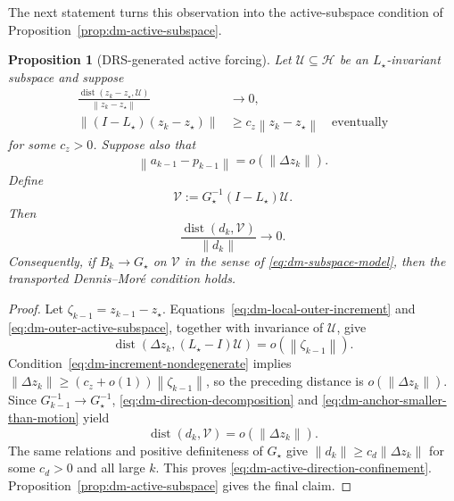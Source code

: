 \documentclass[10pt,leqno]{amsart}
\numberwithin{equation}{section}
\numberwithin{algorithm}{section}
\newtheorem{proposition}[theorem]{Proposition}
\theoremstyle{remark}
\newcommand{\Hcal}{\mathcal{H}}
\DeclareMathOperator{\dist}{dist}
\newcommand{\norm}[1]{\left\lVert #1 \right\rVert}
\begin{document}
The next statement turns this observation into the active-subspace condition of Proposition~\ref{prop:dm-active-subspace}.

\begin{proposition}[DRS-generated active forcing]
\label{prop:dm-active-forcing}
Let \(\mathcal U\subseteq\Hcal\) be an \(L_\star\)-invariant subspace and suppose
\begin{align}
    \frac{\dist(z_k-z_\star,\mathcal U)}{\norm{z_k-z_\star}}&\to0,
    \label{eq:dm-outer-active-subspace}\\
    \norm{(I-L_\star)(z_k-z_\star)}&\ge
       c_z\norm{z_k-z_\star}
       \quad\text{eventually}
    \label{eq:dm-increment-nondegenerate}
\end{align}
for some \(c_z>0\).  Suppose also that
\begin{equation}
\label{eq:dm-anchor-smaller-than-motion}
    \norm{a_{k-1}-p_{k-1}}=o(\norm{\Delta z_k}).
\end{equation}
Define
\begin{equation}
\label{eq:dm-active-forcing-subspace}
    \mathcal V:=G_\star^{-1}(I-L_\star)\mathcal U.
\end{equation}
Then
\begin{equation}
\label{eq:dm-active-direction-confinement}
    \frac{\dist(d_k,\mathcal V)}{\norm{d_k}}\longrightarrow0.
\end{equation}
Consequently, if \(B_k\to G_\star\) on \(\mathcal V\) in the sense of
\eqref{eq:dm-subspace-model}, then the transported Dennis--Mor\'e condition holds.
\end{proposition}

\begin{proof}
Let \(\zeta_{k-1}=z_{k-1}-z_\star\).  Equations~\eqref{eq:dm-local-outer-increment} and
\eqref{eq:dm-outer-active-subspace}, together with invariance of \(\mathcal U\), give
\[
    \dist(\Delta z_k,(L_\star-I)\mathcal U)
       =o(\norm{\zeta_{k-1}}).
\]
Condition~\eqref{eq:dm-increment-nondegenerate} implies
\(\norm{\Delta z_k}\ge(c_z+o(1))\norm{\zeta_{k-1}}\), so the preceding distance is
\(o(\norm{\Delta z_k})\).  Since \(G_{k-1}^{-1}\to G_\star^{-1}\),
\eqref{eq:dm-direction-decomposition} and
\eqref{eq:dm-anchor-smaller-than-motion} yield
\[
    \dist(d_k,\mathcal V)=o(\norm{\Delta z_k}).
\]
The same relations and positive definiteness of \(G_\star\) give
\(\norm{d_k}\ge c_d\norm{\Delta z_k}\) for some \(c_d>0\) and all large \(k\).
This proves \eqref{eq:dm-active-direction-confinement}.  Proposition~\ref{prop:dm-active-subspace} gives the final claim.
\end{proof}
\end{document}
